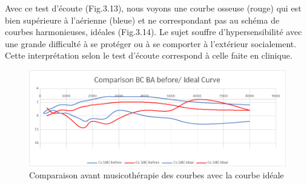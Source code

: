 Avec ce test d'écoute (Fig.3.13), nous voyons une 
courbe osseuse (rouge) qui est bien supérieure à l'aérienne (bleue) et ne correspondant pas au schéma 
de courbes harmonieuses, idéales (Fig.3.14). Le sujet souffre d'hypersensibilité 
avec une 
grande 
difficulté à se protéger ou à se comporter à l'extérieur socialement. Cette interprétation selon le test 
d'écoute   
correspond à 
celle faite en clinique.
	\begin{figure}
	\centering
	\includegraphics[width=1\linewidth]{images/clinique/comparison_bc_ba_before_vs_ideal_curve_meyer.png}
	\caption[Comparaison avec la courbe idéale]{Comparaison avant
		musicothérapie des
		courbes  avec la courbe idéale}
	\label{fig:comparisonbcbabeforevsidealcurvemeyer}
\end{figure}


